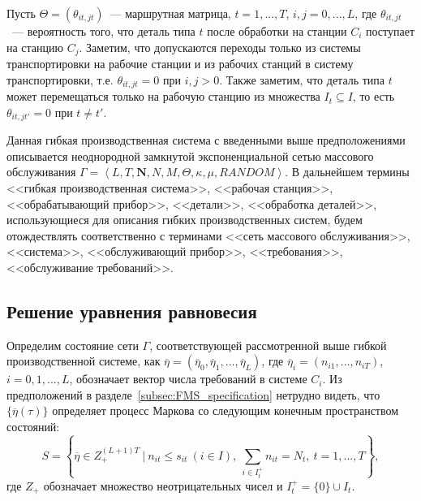 \documentclass[a4paper,14pt]{extarticle}
\theoremstyle{note}
\begin{document}
Пусть $\Theta = (\theta_{it,jt})$~--- маршрутная матрица, $t=1,...,T$, $i,j=0,...,L$, где $\theta_{it,jt}$~--- вероятность того, что деталь типа $t$ после обработки на станции $C_i$ поступает на станцию $C_j$. Заметим, что допускаются переходы только из системы транспортировки на рабочие станции и из рабочих станций в систему транспортировки, т.е. $\theta_{it,jt}=0$ при $i,j>0$. Также заметим, что деталь типа $t$ может перемещаться только на рабочую станцию из множества $I_t \subseteq I$, то есть $\theta_{it,jt'}=0$ при $t \neq t'$.

Данная гибкая производственная система с введенными выше предположениями описывается неоднородной замкнутой экспоненциальной сетью массового обслуживания $\Gamma=\left<L,T,\mathbf{N},N,M,\Theta,\kappa,\mu,\textit{RANDOM}\right>$. В дальнейшем термины <<гибкая производственная система>>, <<рабочая станция>>, <<обрабатывающий прибор>>, <<детали>>, <<обработка деталей>>, использующиеся для описания гибких производственных систем, будем отождествлять соответственно с терминами <<сеть массового обслуживания>>, <<система>>, <<обслуживающий прибор>>, <<требования>>, <<обслуживание требований>>.

\subsection{Решение уравнения равновесия}
\label{subsec:solution}

Определим состояние сети $\Gamma$, соответствующей рассмотренной выше гибкой производственной системе, как $\overline{\eta} = (\overline{\eta}_0, \overline{\eta}_1,...,\overline{\eta}_L)$, где $\overline{\eta}_i = (n_{i1},...,n_{iT})$, $i=0,1,...,L$, обозначает вектор числа требований в системе $C_i$. Из предположений в разделе~\ref{subsec:FMS_specification} нетрудно видеть, что $\{ \overline{\eta}(\tau) \}$ определяет процесс Маркова со следующим конечным пространством состояний:
\begin{equation}
 S = \left\lbrace \overline{\eta} \in Z_+^{(L+1)T} ~|~ n_{it} \leqslant s_{it} ~ (i \in I), ~
 \sum_{i \in I_t^+} n_{it} = N_{t}, ~ t=1,...,T \right\rbrace ,
 \label{eq:2.1}
\end{equation}
где $Z_+$ обозначает множество неотрицательных чисел и $I_t^+ = \{ 0 \} \cup I_t$.
\end{document}
